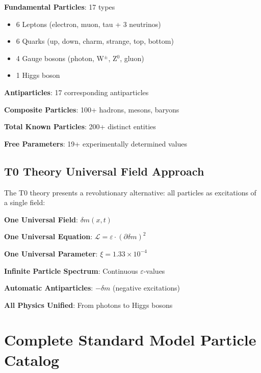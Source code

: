 \documentclass[12pt,a4paper]{article}
\newcommand{\deltam}{\delta m}
\newcommand{\xipar}{\xi}
\newcommand{\Lag}{\mathcal{L}}
\begin{document}
	\begin{tcolorbox}[colback=red!5!white,colframe=red!75!black,title=Standard Model Complexity Crisis]
		\textbf{Fundamental Particles}: 17 types
		\begin{itemize}
			\item 6 Leptons (electron, muon, tau + 3 neutrinos)
			\item 6 Quarks (up, down, charm, strange, top, bottom)
			\item 4 Gauge bosons (photon, W$^{\pm}$, Z$^0$, gluon)
			\item 1 Higgs boson
		\end{itemize}
		
		\textbf{Antiparticles}: 17 corresponding antiparticles
		
		\textbf{Composite Particles}: 100+ hadrons, mesons, baryons
		
		\textbf{Total Known Particles}: 200+ distinct entities
		
		\textbf{Free Parameters}: 19+ experimentally determined values
	\end{tcolorbox}
	
	\subsection{T0 Theory Universal Field Approach}
	
	The T0 theory presents a revolutionary alternative: all particles as excitations of a single field:
	
	\begin{tcolorbox}[colback=blue!5!white,colframe=blue!75!black,title=T0 Universal Field Simplification]
		\textbf{One Universal Field}: $\deltam(x,t)$
		
		\textbf{One Universal Equation}: $\Lag = \varepsilon \cdot (\partial \deltam)^2$
		
		\textbf{One Universal Parameter}: $\xipar = 1.33 \times 10^{-4}$
		
		\textbf{Infinite Particle Spectrum}: Continuous $\varepsilon$-values
		
		\textbf{Automatic Antiparticles}: $-\deltam$ (negative excitations)
		
		\textbf{All Physics Unified}: From photons to Higgs bosons
	\end{tcolorbox}
	
	\section{Complete Standard Model Particle Catalog}
	
\end{document}
